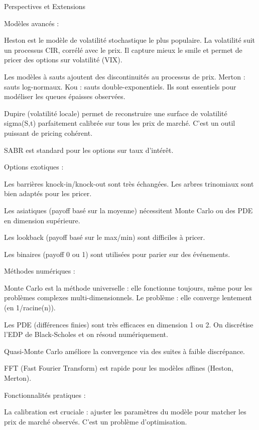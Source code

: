 \documentclass[aspectratio=169, 10pt]{beamer}
\begin{document}
\begin{frame}{Perspectives et Extensions}
{        Modèles avancés :
        
        Heston est le modèle de volatilité stochastique le plus populaire.
        La volatilité suit un processus CIR, corrélé avec le prix.
        Il capture mieux le smile et permet de pricer des options sur volatilité (VIX).
        
        Les modèles à sauts ajoutent des discontinuités au processus de prix.
        Merton : sauts log-normaux. Kou : sauts double-exponentiels.
        Ils sont essentiels pour modéliser les queues épaisses observées.
        
        Dupire (volatilité locale) permet de reconstruire une surface
        de volatilité sigma(S,t) parfaitement calibrée sur tous les prix de marché.
        C'est un outil puissant de pricing cohérent.
        
        SABR est standard pour les options sur taux d'intérêt.
        
        Options exotiques :
        
        Les barrières knock-in/knock-out sont très échangées.
        Les arbres trinomiaux sont bien adaptés pour les pricer.
        
        Les asiatiques (payoff basé sur la moyenne) nécessitent Monte Carlo
        ou des PDE en dimension supérieure.
        
        Les lookback (payoff basé sur le max/min) sont difficiles à pricer.
        
        Les binaires (payoff 0 ou 1) sont utilisées pour parier sur des événements.
        
        Méthodes numériques :
        
        Monte Carlo est la méthode universelle : elle fonctionne toujours,
        même pour les problèmes complexes multi-dimensionnels.
        Le problème : elle converge lentement (en 1/racine(n)).
        
        Les PDE (différences finies) sont très efficaces en dimension 1 ou 2.
        On discrétise l'EDP de Black-Scholes et on résoud numériquement.
        
        Quasi-Monte Carlo améliore la convergence via des suites à faible discrépance.
        
        FFT (Fast Fourier Transform) est rapide pour les modèles affines (Heston, Merton).
        
        Fonctionnalités pratiques :
        
        La calibration est cruciale : ajuster les paramètres du modèle
        pour matcher les prix de marché observés. C'est un problème d'optimisation.
        
}
\end{frame}
\end{document}
